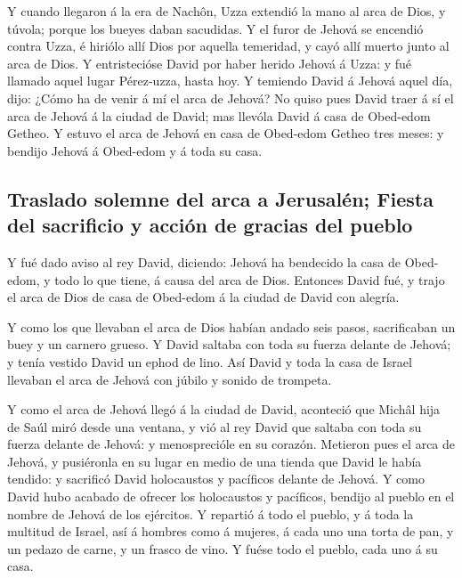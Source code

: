  Y cuando llegaron á la era de Nachôn, Uzza extendió la mano
al arca de Dios, y túvola; porque los bueyes daban sacudidas.
 Y el furor de Jehová se encendió contra Uzza, é hiriólo
allí Dios por aquella temeridad, y cayó allí muerto junto al arca de
Dios.  Y entristecióse David por haber herido Jehová á Uzza:
y fué llamado aquel lugar Pérez-uzza, hasta hoy.  Y temiendo
David á Jehová aquel día, dijo: ¿Cómo ha de venir á mí el arca de
Jehová?  No quiso pues David traer á sí el arca de Jehová á
la ciudad de David; mas llevóla David á casa de Obed-edom Getheo.
 Y estuvo el arca de Jehová en casa de Obed-edom Getheo
tres meses: y bendijo Jehová á Obed-edom y á toda su casa.

\hypertarget{traslado-solemne-del-arca-a-jerusaluxe9n-fiesta-del-sacrificio-y-acciuxf3n-de-gracias-del-pueblo}{%
\subsection{Traslado solemne del arca a Jerusalén; Fiesta del sacrificio
y acción de gracias del
pueblo}\label{traslado-solemne-del-arca-a-jerusaluxe9n-fiesta-del-sacrificio-y-acciuxf3n-de-gracias-del-pueblo}}

 Y fué dado aviso al rey David, diciendo: Jehová ha
bendecido la casa de Obed-edom, y todo lo que tiene, á causa del arca de
Dios. Entonces David fué, y trajo el arca de Dios de casa de Obed-edom á
la ciudad de David con alegría.

 Y como los que llevaban el arca de Dios habían andado seis
pasos, sacrificaban un buey y un carnero grueso.  Y David
saltaba con toda su fuerza delante de Jehová; y tenía vestido David un
ephod de lino.  Así David y toda la casa de Israel llevaban
el arca de Jehová con júbilo y sonido de trompeta.

 Y como el arca de Jehová llegó á la ciudad de David,
aconteció que Michâl hija de Saúl miró desde una ventana, y vió al rey
David que saltaba con toda su fuerza delante de Jehová: y menosprecióle
en su corazón.  Metieron pues el arca de Jehová, y
pusiéronla en su lugar en medio de una tienda que David le había
tendido: y sacrificó David holocaustos y pacíficos delante de Jehová.
 Y como David hubo acabado de ofrecer los holocaustos y
pacíficos, bendijo al pueblo en el nombre de Jehová de los ejércitos.
 Y repartió á todo el pueblo, y á toda la multitud de
Israel, así á hombres como á mujeres, á cada uno una torta de pan, y un
pedazo de carne, y un frasco de vino. Y fuése todo el pueblo, cada uno á
su casa.

